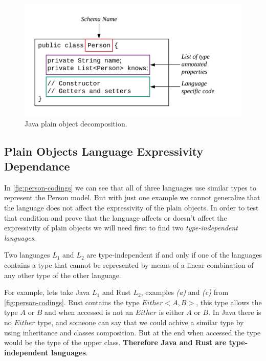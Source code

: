 \begin{figure}
    \includegraphics[scale=0.2]{images/java-analysis.png}
    \centering
    \caption[Java plain object decomposition.]{Java plain object decomposition.}
    \label{fig:java-analysis}
\end{figure}

\subsection{Plain Objects Language Expressivity Dependance}
In \cref{fig:person-codings} we can see that all of three languages use similar types to represent the Person model. But with
just one example we cannot generalize that the language does not affect the expressivity of the plain objects. In order to
test that condition and prove that the language affects or doesn't affect the expressivity of plain objects we will need first
to find two \textit{type-independent languages}.

\begin{definition}
    Two languages $L_1$ and $L_2$ are type-independent if and only if one of the languages contains a type that cannot be
    represented by means of a linear combination of any other type of the other language.
\end{definition}

For example, lets take Java \textit{$L_1$} and Rust \textit{$L_2$}, examples \textit{(a)} and \textit{(c)} from \cref{fig:person-codings}.
Rust contains the type $Either<A,B>$, this type allows the type $A$ or $B$ and when accessed is not an $Either$ is either $A$ or $B$. In
Java there is no $Either$ type, and someone can say that we could achive a similar type by using inheritance and classes composition. But
at the end when accessed the type would be the type of the upper class. \textbf{Therefore Java and Rust are type-independent languages}.

